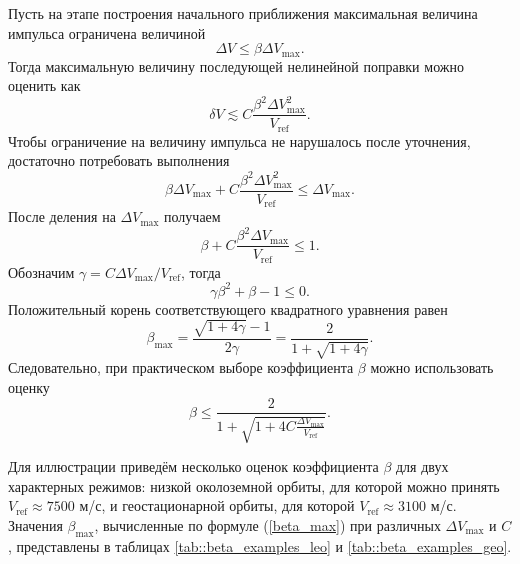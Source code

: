 Пусть на этапе построения начального приближения максимальная величина импульса ограничена величиной
\begin{equation}
    \Delta V \leq \beta \Delta V_{\text{max}}.
\end{equation}
Тогда максимальную величину последующей нелинейной поправки можно оценить как
\begin{equation}
    \delta V \lesssim C \frac{\beta^2 \Delta V_{\text{max}}^2}{V_{\text{ref}}}.
\end{equation}
Чтобы ограничение на величину импульса не нарушалось после уточнения, достаточно потребовать выполнения
\begin{equation}
    \beta \Delta V_{\text{max}} + C \frac{\beta^2 \Delta V_{\text{max}}^2}{V_{\text{ref}}} \leq \Delta V_{\text{max}}.
\end{equation}
После деления на $\Delta V_{\text{max}}$ получаем
\begin{equation}
    \beta + C \frac{\beta^2 \Delta V_{\text{max}}}{V_{\text{ref}}} \leq 1.
\end{equation}
Обозначим $\gamma = C \Delta V_{\text{max}} / V_{\text{ref}}$, тогда
\begin{equation}
    \gamma \beta^2 + \beta - 1 \leq 0.
\end{equation}
Положительный корень соответствующего квадратного уравнения равен
\begin{equation}
    \beta_{\text{max}} = \frac{\sqrt{1 + 4 \gamma} - 1}{2 \gamma} = \frac{2}{1 + \sqrt{1 + 4 \gamma}}.
\label{beta_max}
\end{equation}
Следовательно, при практическом выборе коэффициента $\beta$ можно использовать оценку
\begin{equation}
    \beta \leq \frac{2}{1 + \sqrt{1 + 4 C \frac{\Delta V_{\text{max}}}{V_{\text{ref}}}}}.
\end{equation}

Для иллюстрации приведём несколько оценок коэффициента $\beta$ для двух характерных режимов: низкой околоземной орбиты, для которой можно принять $V_{\text{ref}} \approx 7500$ м/с, и геостационарной орбиты, для которой $V_{\text{ref}} \approx 3100$ м/с. Значения $\beta_{\max}$, вычисленные по формуле (\ref{beta_max}) при различных $\Delta V_{\max}$ и $C$, представлены в таблицах \ref{tab::beta_examples_leo} и \ref{tab::beta_examples_geo}.

